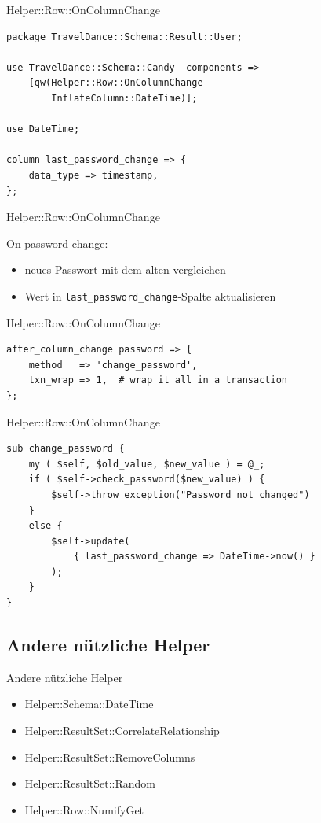 \begin{frame}[fragile]{Helper::Row::OnColumnChange}

\begin{lstlisting}
package TravelDance::Schema::Result::User;

use TravelDance::Schema::Candy -components =>
    [qw(Helper::Row::OnColumnChange 
        InflateColumn::DateTime)];

use DateTime;

column last_password_change => {
    data_type => timestamp,
};
\end{lstlisting}
\end{frame}

\begin{frame}[fragile]{Helper::Row::OnColumnChange}

On password change:

\begin{itemize}
\item neues Passwort mit dem alten vergleichen
\item Wert in \verb|last_password_change|-Spalte aktualisieren
\end{itemize}

\end{frame}

\begin{frame}[fragile]{Helper::Row::OnColumnChange}
\begin{lstlisting}
after_column_change password => {
    method   => 'change_password',
    txn_wrap => 1,  # wrap it all in a transaction
};
\end{lstlisting}
\end{frame}

\begin{frame}[fragile]{Helper::Row::OnColumnChange}
\begin{lstlisting}
sub change_password {
    my ( $self, $old_value, $new_value ) = @_;
    if ( $self->check_password($new_value) ) {
        $self->throw_exception("Password not changed")
    }
    else {
        $self->update(
            { last_password_change => DateTime->now() }
        );
    }
}
\end{lstlisting}
\end{frame}

\subsection{Andere nützliche Helper}
\begin{frame}{Andere nützliche Helper}
\begin{itemize}
\item Helper::Schema::DateTime
\item Helper::ResultSet::CorrelateRelationship
\item Helper::ResultSet::RemoveColumns
\item Helper::ResultSet::Random
\item Helper::Row::NumifyGet
\end{itemize}
\end{frame}

